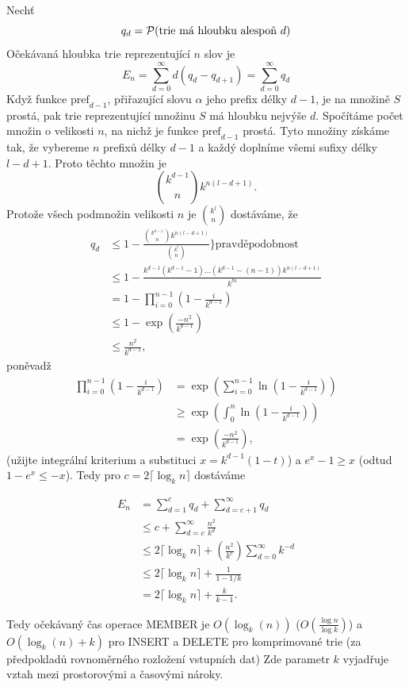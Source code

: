 Nechť
\[
q_d = {\cal P}(\text{trie má hloubku alespoň $d$})
\]
Očekávaná hloubka trie reprezentující $n$ slov je
\[
E_n = \sum_{d=0}^\infty d (q_d - q_{d+1}) = \sum_{d=0}^\infty q_d
\]
Když funkce $\text{pref}_{d-1}$, přiřazující slovu 
$\alpha$ jeho prefix délky $d-1$, je na množině $S$ prostá,
pak trie reprezentující množinu $S$ má hloubku nejvýše $d$.
Spočítáme počet množin o velikosti $n$, na nichž je funkce $\text{pref}_{d-1}$ 
prostá. Tyto množiny získáme tak, že vybereme $n$ prefixů délky $d-1$
a každý doplníme všemi sufixy délky $l-d+1$. Proto těchto množin je
\[
\binom{k^{d-1}}{n} k^{n (l-d+1)}.
\]
Protože všech podmnožin velikosti $n$ je $\binom{k^l}{n}$ dostáváme, že 
\begin{align*}  
q_d 
 &\leq 1 - \frac{\binom{k^{d-1}}{n} k^{n (l-d+1)}}{\binom{k^l}{n}} 
\Biggl\} \text{pravděpodobnost} \\
 &\leq 1 - \frac{k^{d-1}(k^{d-1}-1)\dots(k^{d-1}-(n-1)) k^{n(l-d+1)}}{k^{ln}}\\
 &   = 1 - \prod_{i=0}^{n-1} \left( 1 - \frac{i}{k^{d-1}} \right) \\
 &\leq 1 - \exp\left( \frac{-n^2}{k^{d-1}} \right)\\
 &\leq \frac{n^2}{k^{d-1}},
\end{align*}
poněvadž
\begin{align*}
                  \prod_{i=0}^{n-1}    \left( 1 - \frac{i}{k^{d-1}} \right)
 &   = \exp\left( \sum_{i=0}^{n-1} \ln \left( 1 - \frac{i}{k^{d-1}} \right)
	   \right)\\
 &\geq \exp\left(         \int_0^n \ln \left( 1 - \frac{i}{k^{d-1}} \right)
	   \right)\\
 &   = \exp\left( \frac{-n^2}{k^{d-1}} \right),
\end{align*} 
(užijte integrální kriterium a substituci $x = k^{d-1}(1-t)$) a 
$e^x - 1 \geq x$ (odtud $1 - e^x \leq -x$). 
Tedy pro $c = 2\lceil \log_kn\rceil$ dostáváme

\begin{align*}
E_n
 & = \sum_{d=1}^cq_d + \sum_{d=c+1}^{\infty}q_d\\
 &\leq c + \sum_{d=c}^{\infty}\frac{n^2}{k^d}\\
 &\leq 2\lceil\log_kn\rceil +
		\left( \frac{n^2}{k^c} \right) \sum_{d=0}^{\infty} k^{-d}\\
 &\leq 2\lceil\log_kn\rceil + \frac{1}{1-1/k}\\
 & = 2\lceil\log_kn\rceil + \frac{k}{k-1}.
\end{align*}

Tedy očekávaný čas operace MEMBER je $O(\log_k(n))$ ($O(\frac{\log n}{\log
k})$)
a $O(\log_k(n) + k)$ pro INSERT a DELETE
pro komprimované trie (za předpokladů rovnoměrného rozložení vstupních dat) 
Zde parametr $k$ vyjadřuje vztah mezi prostorovými 
a časovými nároky.

